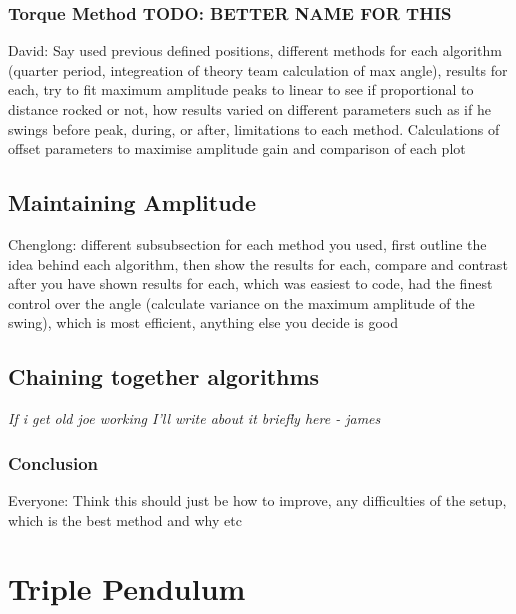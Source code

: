 \documentclass[11pt]{article}
\begin{document}
\subsubsection{Torque Method TODO: BETTER NAME FOR THIS}
David: Say used previous defined positions, different methods for each algorithm (quarter period, integreation of theory team calculation of max angle), results for each, try to fit maximum amplitude peaks to linear to see if proportional to distance rocked or not, how results varied on different parameters such as if he swings before peak, during, or after, limitations to each method.
Calculations of offset parameters to maximise amplitude gain and comparison of each plot

\subsection{Maintaining Amplitude}
Chenglong: different subsubsection for each method you used, first outline the idea behind each algorithm, then show the results for each, compare and contrast after you have shown results for each, which was easiest to code, had the finest control over the angle (calculate variance on the maximum amplitude of the swing), which is most efficient, anything else you decide is good

\subsection{Chaining together algorithms}
\textit{If i get old joe working I'll write about it briefly here - james}


\subsubsection{Conclusion}
Everyone: Think this should just be how to improve, any difficulties of the setup, which is the best method and why etc

\section{Triple Pendulum}
\end{document}
